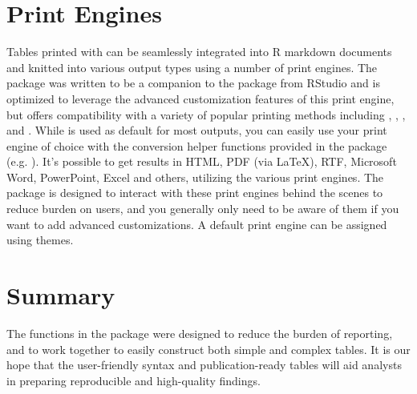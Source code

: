 \section{Print Engines}

Tables printed with  can be seamlessly integrated into R markdown documents and knitted into various output types using a number of print engines.
The package was written to be a companion to the  package from RStudio and is optimized to leverage the advanced customization features of this print engine, but offers compatibility with a variety of popular printing methods including  \citep{knitr},   \citep{flextable},  \citep{huxtable}, and  \citep{kableExtra}.
While  is used as default for most outputs, you can easily use your print engine of choice with the conversion helper functions provided in the package (e.g. ).
It's possible to get results in HTML, PDF (via \LaTeX), RTF, Microsoft Word, PowerPoint, Excel and others, utilizing the various print engines.
The package is designed to interact with these print engines behind the scenes to reduce burden on users, and you generally only need to be aware of them if you want to add advanced customizations.
A default print engine can be assigned using  themes.

\section{Summary}

The functions in the  package were designed to reduce the burden of reporting, and to work together to easily construct both simple and complex tables.
It is our hope that the user-friendly syntax and publication-ready tables will aid analysts in preparing reproducible and high-quality findings.



\address{Daniel D. Sjoberg\\
  Memorial Sloan Kettering Cancer Center\\
  1275 York Ave., New York, New York 10022\\
  USA\\
  ORCiD: 0000-0003-0862-2018\\
  }

\address{Karissa Whiting\\
  Memorial Sloan Kettering Cancer Center\\
  1275 York Ave., New York, New York 10022\\
  USA\\
  ORCiD: 0000-0002-4683-1868\\
  }

\address{Michael Curry\\
  Memorial Sloan Kettering Cancer Center\\
  1275 York Ave., New York, New York 10022\\
  USA\\
  ORCiD: 0000-0002-0261-4044\\
  }
